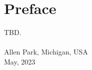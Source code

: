 \chapter{Preface}

TBD.
\\\\
\noindent\hspace*{2.5in}Allen Park, Michigan, USA\\
\noindent\hspace*{2.5in}May, 2023
